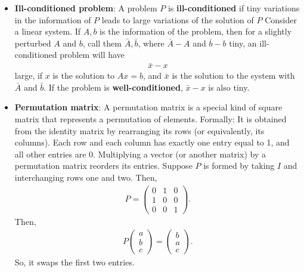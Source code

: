 \documentclass{report}
\begin{document}
\begin{itemize}
        \item \textbf{Ill-conditioned problem}: A problem $P$ is \textbf{ill-conditioned} if tiny variations in the information of $P$ leads to large variations of the solution of $P$
            \bigbreak \noindent 
            Consider a linear system. If $A,b$ is the information of the problem, then for a slightly perturbed $A$ and $b$, call them $\bar{A},\bar{b}$, where $\bar{A} - A$ and $\bar{b} - b$ tiny, an ill-conditioned problem will have 
            \begin{align*}
                \bar{x} - x
            \end{align*}
            large, if $x$ is the solution to $Ax = b$, and $\bar{x}$ is the solution to the system with $\bar{A}$ and $\bar{b}$.
            \bigbreak \noindent 
            If the problem is \textbf{well-conditioned}, $\bar{x} -x$ is also tiny.
        \item \textbf{Permutation matrix}: A permutation matrix is a special kind of square matrix that represents a permutation of elements. Formally:
            It is obtained from the identity matrix by rearranging its rows (or equivalently, its columns).
            \bigbreak \noindent 
            Each row and each column has exactly one entry equal to 1, and all other entries are 0.
            \bigbreak \noindent 
            Multiplying a vector (or another matrix) by a permutation matrix reorders its entries.
            \bigbreak \noindent 
            Suppose $P$ is formed by taking $I$ and interchanging rows one and two. Then,
            \begin{align*}
                P = \begin{pmatrix} 0 & 1 & 0 \\ 1 & 0 & 0 \\ 0 & 0 & 1 \end{pmatrix}
            .\end{align*}
            Then, 
            \begin{align*}
                P\begin{pmatrix} a \\ b \\ c \end{pmatrix} = \begin{pmatrix} b \\ a \\ c \end{pmatrix}
            .\end{align*}
            So, it swaps the first two entries.


    \end{itemize}
\end{document}
